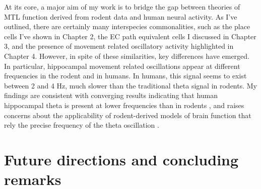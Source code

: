 At its core, a major aim of my work is to bridge the gap between theories of MTL function derived from rodent data and human neural activity. As I've outlined, there are certainly many interspecies commonalities, such as the place cells I've shown in Chapter 2, the EC path equivalent cells I discussed in Chapter 3, and the presence of movement related oscillatory activity highlighted in Chapter 4. However, in spite of these similarities, key differences have emerged. In particular, hippocampal movement related oscillations appear at different frequencies in the rodent and in humans. In humans, this signal seems to exist between 2 and 4 Hz, much slower than the traditional theta signal in rodents. My findings are consistent with converging results indicating that human hippocampal theta is present at lower frequencies than in rodents \citep{WatrEtal13a,Jaco14}, and raises concerns about the applicability of rodent-derived models of brain function that rely the precise frequency of the theta oscillation \citep{JensLism98,BurgEtal07}.










% 

\section{Future directions and concluding remarks}

